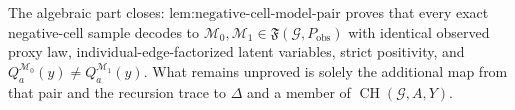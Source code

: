 The algebraic part closes: \(\text{lem:negative-cell-model-pair}\) proves that every exact negative-cell sample decodes to \(\mathcal M_0,\mathcal M_1\in\mathfrak F(\mathcal G,P_{\mathrm{obs}})\) with identical observed proxy law, individual-edge-factorized latent variables, strict positivity, and \(Q_a^{\mathcal M_0}(y)\neq Q_a^{\mathcal M_1}(y)\). What remains unproved is solely the additional map from that pair and the recursion trace to \(\Delta\) and a member of \(\operatorname{CH}(\mathcal G,A,Y)\).